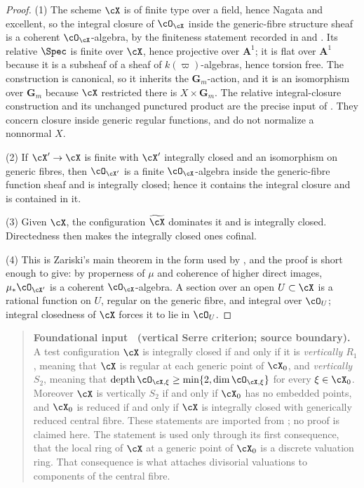\begin{proof}
(1)  The scheme $\cX$ is of finite type over a field, hence Nagata and
excellent, so the integral closure of $\cO_{\cX}$ inside the generic-fibre structure
sheaf is a coherent $\cO_{\cX}$-algebra, by the
finiteness statement recorded in  and
\cite[\href{https://stacks.math.columbia.edu/tag/035S}{Tag 035S}]
{stacks-project}.  Its relative $\Spec$ is finite over $\cX$, hence
projective over $\mathbf A^1$; it is flat over $\mathbf A^1$ because it
is a subsheaf of a sheaf of $k(\varpi)$-algebras, hence torsion free.  The
construction is canonical, so it inherits the $\mathbf G_m$-action, and
it is an isomorphism over $\mathbf G_m$ because $\cX$ restricted there
is $X\times\mathbf G_m$.  The relative integral-closure construction and its unchanged
punctured product are the precise input of
\cite[Definition~1.10 and the paragraph following Example~1.11]{BJ22}.
They concern closure inside generic regular functions, and do not
normalize a nonnormal $X$.

(2)  If $\cX'\to\cX$ is finite with $\cX'$ integrally closed and an
isomorphism on generic fibres, then $\cO_{\cX'}$ is a finite
$\cO_{\cX}$-algebra inside the generic-fibre function sheaf and is
integrally closed; hence it contains the integral closure and is contained
in it.

(3)  Given $\cX$, the configuration $\widetilde\cX$ dominates it and is
integrally closed.  Directedness then makes the integrally closed ones
cofinal.

(4)  This is Zariski's main theorem in the form used by
\cite[Lemma~1.12]{BJ22}, and the proof is short enough to give: by
properness of $\mu$ and coherence of higher direct images,
$\mu_\ast\cO_{\cX'}$ is a coherent $\cO_{\cX}$-algebra.  A section over
an open $U\subset\cX$ is a rational function on $U$, regular on the
generic fibre, and integral over $\cO_U$; integral closedness of $\cX$
forces it to lie in $\cO_U$.
\end{proof}

\label{thm:ch33-integrally-closed-criterion}
\begin{quote}
\textbf{Foundational input \thetheorem\ (vertical Serre criterion; source
boundary).}
A test configuration $\cX$ is integrally closed if and only if it is
\emph{vertically $R_1$}, meaning that $\cX$ is regular at each generic
point of $\cX_0$, and \emph{vertically $S_2$}, meaning that
$\operatorname{depth}\cO_{\cX,\xi}\geq\min\{2,\dim\cO_{\cX,\xi}\}$ for
every $\xi\in\cX_0$.  Moreover $\cX$ is vertically $S_2$ if and only
if $\cX_0$ has no embedded points, and $\cX_0$ is reduced if and only if
$\cX$ is integrally closed with generically reduced central fibre.
These statements are imported from \cite[Theorem~1.13, Lemma~1.15
and Corollary~1.16]{BJ22}; no proof is
claimed here.  The statement is used only through its first consequence, that
the local ring of $\cX$ at a generic point of $\cX_0$ is a discrete
valuation ring.  That consequence is what attaches divisorial valuations to
components of the central fibre.
\end{quote}

